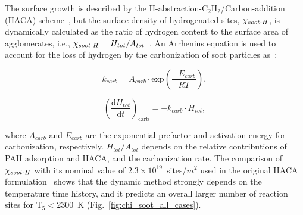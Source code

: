The surface growth is described by the H-abstraction-$\mathrm{C_2H_2}$/Carbon-addition (HACA) scheme~\citep{appel2000kinetic}, but the surface density of hydrogenated sites, $\chi_{soot{\text-}H}$, is dynamically calculated as the ratio of hydrogen content to the surface area of agglomerates, i.e., $\chi_{soot{\text-}H}=H_{tot}/A_{tot}$~\citep{blanquart2009analyzing}. An Arrhenius equation is used to account for the loss of hydrogen by the carbonization of soot particles as~\citep{basile2002coagulation}:

\begin{equation}
	k_{carb}=
	A_{carb}\cdot \mathrm{exp}(\frac{-E_{carb}}{RT}),
	\label{eqn:k_carb}
\end{equation}

\begin{equation}
	\left(\frac{\mathrm{d}H_{tot}}{\mathrm{d}t}\right)_{\mathrm{carb}}=
	-k_{carb}\cdot H_{tot},
	\label{eqn:carb_rate}
\end{equation}

\noindent where $A_{carb}$ and $E_{carb}$ are the exponential prefactor and activation energy for carbonization, respectively. $H_{tot}/A_{tot}$ depends on the relative contributions of PAH adsorption and HACA, and the carbonization rate. The comparison of $\chi_{soot{\text-}H}$ with its nominal value of $2.3\times10^{19}$~sites/$m^2$ used in the original HACA formulation~\citep{frenklach1991detailed} shows that the dynamic method strongly depends on the temperature time history, and it predicts an overall larger number of reaction sites for T$_5$$<$2300~K (Fig.~\ref{fig:chi_soot_all_cases}).
